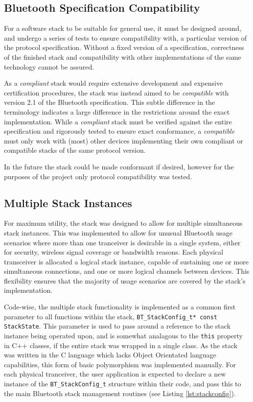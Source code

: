 \FloatBarrier
\subsection{Bluetooth Specification Compatibility}

For a software stack to be suitable for general use, it must be designed around, and undergo a series of tests to ensure compatibility with, a particular version of the protocol specification. Without a fixed version of a specification, correctness of the finished stack and compatibility with other implementations of the same technology cannot be assured.

As a \textit{compliant} stack would require extensive development and expensive certification procedures, the stack was instead aimed to be \textit{compatible} with version 2.1 of the Bluetooth specification. This subtle difference in the terminology indicates a large difference in the restrictions around the exact implementation. While a \textit{compliant} stack must be verified against the entire specification and rigorously tested to ensure exact conformance, a \textit{compatible} must only work with (most) other devices implementing their own compliant or compatible stacks of the same protocol version.

In the future the stack could be made conformant if desired, however for the purposes of the project only protocol compatibility was tested.

\FloatBarrier
\subsection{Multiple Stack Instances}

For maximum utility, the stack was designed to allow for multiple simultaneous stack instances. This was implemented to allow for unusual Bluetooth usage scenarios where more than one tranceiver is desirable in a single system, either for security, wireless signal coverage or bandwidth reasons. Each physical transceiver is allocated a logical stack instance, capable of sustaining one or more simultaneous connections, and one or more logical channels between devices. This flexibility ensures that the majority of usage scenarios are covered by the stack's implementation.

Code-wise, the multiple stack functionality is implemented as a common first parameter to all functions within the stack, \lstinline{BT_StackConfig_t* const StackState}. This parameter is used to pass around a reference to the stack instance being operated upon, and is somewhat analagous to the \lstinline{this} property in C++ classes, if the entire stack was wrapped in a single class. As the stack was written in the C language which lacks Object Orientated language capabilities, this form of basic polymorphism was implemented manually. For each physical tranceiver, the user application is expected to declare a new instance of the \lstinline{BT_StackConfig_t} structure within their code, and pass this to the main Bluetooth stack management routines (see Listing \ref{lst:stackconfig}).

